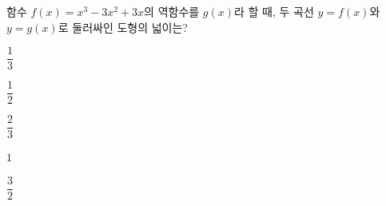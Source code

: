 함수 $f(x)=x^3-3x^2+3x$의 역함수를 $g(x)$라 할 때, 두 곡선 $y=f(x)$와 $y=g(x)$로 둘러싸인 도형의 넓이는?
\begin{choices32}{\rule[-3ex]{0pt}{8ex}$\dfrac{1}{3}$}{\rule[-3ex]{0pt}{8ex}$\dfrac{1}{2}$}{\rule[-3ex]{0pt}{8ex}$\dfrac{2}{3}$}{\rule[-3ex]{0pt}{8ex}$1$}{\rule[-3ex]{0pt}{8ex}$\dfrac{3}{2}$}\end{choices32}
